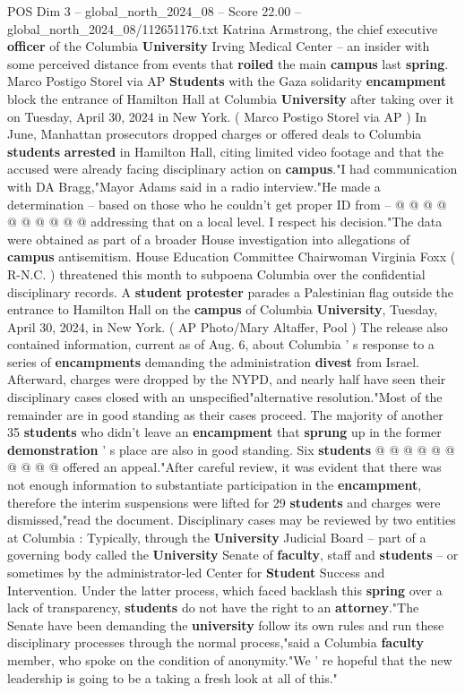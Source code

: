 \begin{textsample}{POS Dim 3 – global\_north\_2024\_08 – Score 22.00 – global\_north\_2024\_08/112651176.txt}
Katrina Armstrong, the chief executive \textbf{officer} of the Columbia \textbf{University} Irving Medical Center -- an insider with some perceived distance from events that \textbf{roiled} the main \textbf{campus} last \textbf{spring}.
Marco Postigo Storel via AP \textbf{Students} with the Gaza solidarity \textbf{encampment} block the entrance of Hamilton Hall at Columbia \textbf{University} after taking over it on Tuesday, April 30, 2024 in New York. ( Marco Postigo Storel via AP ) In June, Manhattan prosecutors dropped charges or offered deals to Columbia \textbf{students} \textbf{arrested} in Hamilton Hall, citing limited video footage and that the accused were already facing disciplinary action on \textbf{campus}."I had communication with DA Bragg,"Mayor Adams said in a radio interview."He made a determination -- based on those who he couldn't get proper ID from -- @ @ @ @ @ @ @ @ @ @ addressing that on a local level.
I respect his decision."The data were obtained as part of a broader House investigation into allegations of \textbf{campus} antisemitism.
House Education Committee Chairwoman Virginia Foxx ( R-N.C. ) threatened this month to subpoena Columbia over the confidential disciplinary records.
A \textbf{student} \textbf{protester} parades a Palestinian flag outside the entrance to Hamilton Hall on the \textbf{campus} of Columbia \textbf{University}, Tuesday, April 30, 2024, in New York. ( AP Photo/Mary Altaffer, Pool ) The release also contained information, current as of Aug. 6, about Columbia ' s response to a series of \textbf{encampments} demanding the administration \textbf{divest} from Israel.
Afterward, charges were dropped by the NYPD, and nearly half have seen their disciplinary cases closed with an unspecified"alternative resolution."Most of the remainder are in good standing as their cases proceed.
The majority of another 35 \textbf{students} who didn't leave an \textbf{encampment} that \textbf{sprung} up in the former \textbf{demonstration} ' s place are also in good standing.
Six \textbf{students} @ @ @ @ @ @ @ @ @ @ offered an appeal."After careful review, it was evident that there was not enough information to substantiate participation in the \textbf{encampment}, therefore the interim suspensions were lifted for 29 \textbf{students} and charges were dismissed,"read the document.
Disciplinary cases may be reviewed by two entities at Columbia : Typically, through the \textbf{University} Judicial Board -- part of a governing body called the \textbf{University} Senate of \textbf{faculty}, staff and \textbf{students} -- or sometimes by the administrator-led Center for \textbf{Student} Success and Intervention.
Under the latter process, which faced backlash this \textbf{spring} over a lack of transparency, \textbf{students} do not have the right to an \textbf{attorney}."The Senate have been demanding the \textbf{university} follow its own rules and run these disciplinary processes through the normal process,"said a Columbia \textbf{faculty} member, who spoke on the condition of anonymity."We ' re hopeful that the new leadership is going to be a taking a fresh look at all of this."


\end{textsample}
